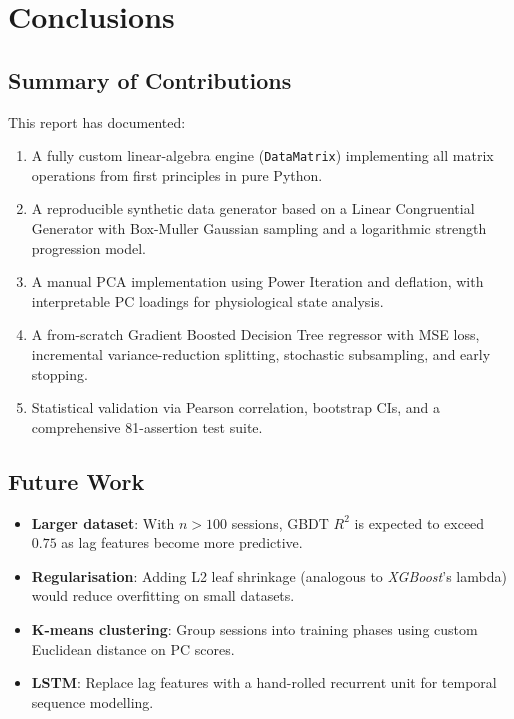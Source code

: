 \documentclass[12pt,a4paper]{report}
\theoremstyle{definition}
\begin{document}
\chapter{Conclusions}

\section{Summary of Contributions}

This report has documented:

\begin{enumerate}
  \item A fully custom linear-algebra engine (\texttt{DataMatrix}) implementing
        all matrix operations from first principles in pure Python.
  \item A reproducible synthetic data generator based on a Linear Congruential
        Generator with Box-Muller Gaussian sampling and a logarithmic strength
        progression model.
  \item A manual PCA implementation using Power Iteration and deflation, with
        interpretable PC loadings for physiological state analysis.
  \item A from-scratch Gradient Boosted Decision Tree regressor with MSE loss,
        incremental variance-reduction splitting, stochastic subsampling, and
        early stopping.
  \item Statistical validation via Pearson correlation, bootstrap CIs, and
        a comprehensive 81-assertion test suite.
\end{enumerate}

\section{Future Work}

\begin{itemize}
  \item \textbf{Larger dataset}: With $n > 100$ sessions, GBDT $R^2$ is expected
        to exceed $0.75$ as lag features become more predictive.
  \item \textbf{Regularisation}: Adding L2 leaf shrinkage (analogous to
        \textit{XGBoost}'s lambda) would reduce overfitting on small datasets.
  \item \textbf{K-means clustering}: Group sessions into training phases
        using custom Euclidean distance on PC scores.
  \item \textbf{LSTM}: Replace lag features with a hand-rolled recurrent unit
        for temporal sequence modelling.
\end{itemize}
\end{document}
